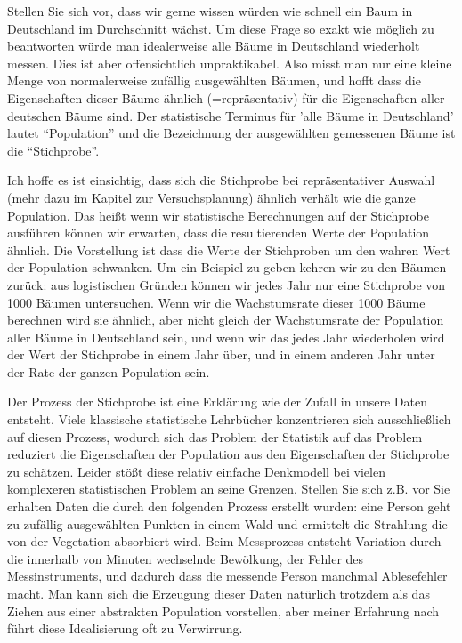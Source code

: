 \documentclass[a4paper,twoside]{tufte-book}\usepackage[]{graphicx}\usepackage[]{color}
\begin{document}
	Stellen Sie sich vor, dass wir gerne wissen würden wie schnell ein Baum in Deutschland im Durchschnitt wächst. Um diese Frage so exakt wie möglich zu beantworten würde man idealerweise alle Bäume in Deutschland wiederholt messen. Dies ist aber offensichtlich unpraktikabel. Also misst man nur eine kleine Menge von normalerweise zufällig ausgewählten Bäumen, und hofft dass die Eigenschaften dieser Bäume ähnlich (=repräsentativ) für die Eigenschaften aller deutschen Bäume sind. Der statistische Terminus für 'alle Bäume in Deutschland' lautet "`Population"' und die Bezeichnung der ausgewählten gemessenen Bäume ist die "`Stichprobe"'.
		
	Ich hoffe es ist einsichtig, dass sich die Stichprobe bei repräsentativer Auswahl (mehr dazu im Kapitel zur Versuchsplanung) ähnlich verhält wie die ganze Population. Das heißt wenn wir statistische Berechnungen auf der Stichprobe ausführen können wir erwarten, dass die resultierenden Werte der Population ähnlich. Die Vorstellung ist dass die Werte der Stichproben um den wahren Wert der Population schwanken. Um ein Beispiel zu geben kehren wir zu den Bäumen zurück: aus logistischen Gründen können wir jedes Jahr nur eine Stichprobe von 1000 Bäumen untersuchen. Wenn wir die Wachstumsrate dieser 1000 Bäume berechnen wird sie ähnlich, aber nicht gleich der Wachstumsrate der Population aller Bäume in Deutschland sein, und wenn wir das jedes Jahr wiederholen wird der Wert der Stichprobe in einem Jahr über, und in einem anderen Jahr unter der Rate der ganzen Population sein. 
	
	Der Prozess der Stichprobe ist eine Erklärung wie der Zufall in unsere Daten entsteht. Viele klassische statistische Lehrbücher konzentrieren sich ausschließlich auf diesen Prozess, wodurch sich das Problem der Statistik auf das Problem reduziert die Eigenschaften der Population aus den Eigenschaften der Stichprobe zu schätzen. Leider stößt diese relativ einfache Denkmodell bei vielen komplexeren statistischen Problem an seine Grenzen. Stellen Sie sich z.B. vor Sie erhalten Daten die durch den folgenden Prozess erstellt wurden: eine Person geht zu zufällig ausgewählten Punkten in einem Wald und ermittelt die Strahlung die von der Vegetation absorbiert wird. Beim Messprozess entsteht Variation durch die innerhalb von Minuten wechselnde Bewölkung, der Fehler des Messinstruments, und dadurch dass die messende Person manchmal Ablesefehler macht. Man kann sich die Erzeugung dieser Daten natürlich trotzdem als das Ziehen aus einer abstrakten Population vorstellen, aber meiner Erfahrung nach führt diese Idealisierung oft zu Verwirrung. 
	
\end{document}
